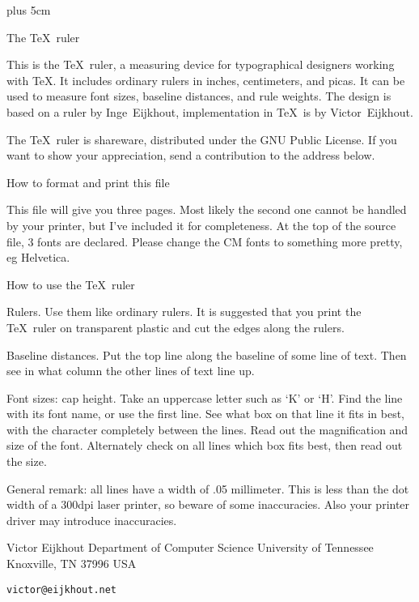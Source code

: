 \def\opskip{\vskip.5mm\relax}
\let\neerskip\opskip

\output{}

\begingroup\hsize=12cm \vsize=8in
\parindent=0pt \parskip=6pt
\rightskip=0cm plus 5cm \normalbaselines

\hbox{}\vskip3cm
\big The \TeX\ ruler

\manual
This is the \TeX\ ruler, a measuring device for
typographical designers working with \TeX. It includes ordinary
rulers in inches, centimeters, and picas.
It can be used to measure font sizes, baseline distances,
and rule weights. The design is based on a ruler
by Inge~Eijkhout, implementation in \TeX\ is by 
Victor~Eijkhout.

The \TeX\ ruler is shareware, distributed under the GNU Public License.
If you want to show your appreciation, send a contribution
to the address below.

How to format and print this file

This file will give you three pages. Most likely the second one
cannot be handled by your printer, but I've included it for
completeness. At the top of the source file, 3 fonts are
declared. Please change the CM fonts to something more pretty,
eg Helvetica.

How to use the \TeX\ ruler

Rulers. Use them like ordinary rulers. It is suggested
that you print the \TeX\ ruler on transparent plastic and
cut the edges along the rulers.

Baseline distances. Put the top line along the baseline
of some line of text. Then see in what column the other
lines of text line up.

Font sizes: cap height. Take an uppercase letter
such as `K' or `H'. Find the line with its font name,
or use the first line. See what box on that line
it fits in best, with the character completely between
the lines. Read out the magnification and size of the
font. Alternately check on all lines which box fits
best, then read out the size.

General remark: all lines have a width of .05 millimeter. 
This is less than the dot width of a 300dpi
laser printer, so beware of some inaccuracies.
Also your printer driver may introduce 
inaccuracies.

\leavevmode
{\obeylines \parskip=0pt %
Victor Eijkhout
Department of Computer Science
University of Tennessee
Knoxville, TN 37996
USA\par {\tt victor@eijkhout.net}}

